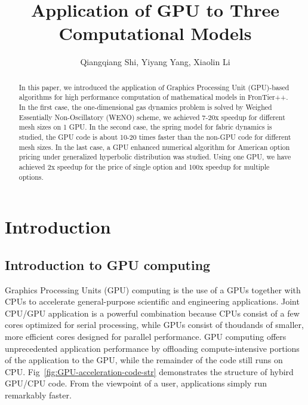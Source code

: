 \documentclass[mathpazo]{cicp}
\theoremstyle{theoremlike}
\theoremstyle{definition}
\theoremstyle{remark}
\newcommand{\Fig}[1]{Fig~\ref{#1}}
\newcommand{\etal}{{\it et~al}.\ }
\begin{document}
\title{Application of GPU to Three Computational Models}

\author[Qiangqiang Shi \etal]{
Qiangqiang Shi\comma\corrauth,
Yiyang Yang,
Xiaolin Li
}

\address{\ Department of Applied Mathematics and Statistics,
Stony Brook University, Stony Brook, NY 11794--3600, United States of America.}

\begin{abstract}
In this paper, we introduced the application of Graphics Processing
Unit (GPU)-based algorithms for high performance computation of mathematical
models in FronTier++. In the first case, the one-dimensional gas dynamics
problem is solved by Weighed Essentially Non-Oscillatory (WENO) scheme,
we achieved 7-20x speedup for different mesh sizes on 1 GPU. In the
second case, the spring model for fabric dynamics is studied, the
GPU code is about 10-20 times faster than the non-GPU code for different
mesh sizes. In the last case, a GPU enhanced numerical algorithm for
American option pricing under generalized hyperbolic distribution
was studied. Using one GPU, we have achieved 2x speedup for the price
of single option and 100x speedup for multiple options.
\end{abstract}


\maketitle


\section{Introduction}

\subsection{Introduction to GPU computing}
Graphics Processing Units (GPU) computing \cite{kirk2010programming} is
the use of a GPUs together
with CPUs to accelerate general-purpose scientific and engineering
applications. Joint CPU/GPU application is a powerful combination
because CPUs consist of a few cores optimized for serial processing,
while GPUs consist of thoudands of smaller, more efficient cores designed
for parallel performance. GPU computing offers unprecedented application
performance by offloading compute-intensive portions of the application
to the GPU, while the remainder of the code still runs on CPU. 
\Fig{fig:GPU-acceleration-code-str} demonstrates the structure of hybird
GPU/CPU code. From the viewpoint of a user, applications simply run
remarkably faster.
\end{document}
